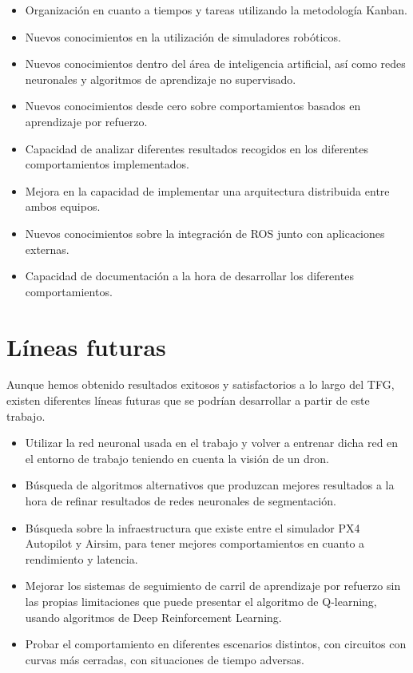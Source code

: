 \begin{itemize}
    \item Organización en cuanto a tiempos y tareas utilizando la metodología Kanban.
    \item Nuevos conocimientos en la utilización de simuladores robóticos.
    \item Nuevos conocimientos dentro del área de inteligencia artificial, así como redes neuronales y algoritmos de
    aprendizaje no supervisado. 
    \item Nuevos conocimientos desde cero sobre comportamientos basados en aprendizaje por refuerzo.
    \item Capacidad de analizar diferentes resultados recogidos en los diferentes comportamientos implementados.
    \item Mejora en la capacidad de implementar una arquitectura distribuida entre ambos equipos.
    \item Nuevos conocimientos sobre la integración de ROS junto con aplicaciones externas.
    \item Capacidad de documentación a la hora de desarrollar los diferentes comportamientos. 
\end{itemize}

\section{Líneas futuras}
\label{lineas_futuras}
Aunque hemos obtenido resultados exitosos y satisfactorios a lo largo del TFG, existen diferentes líneas futuras que se
podrían desarrollar a partir de este trabajo.

\begin{itemize}
\item Utilizar la red neuronal usada en el trabajo y volver a entrenar dicha red en el entorno de trabajo teniendo en
cuenta la visión de un dron.
\item Búsqueda de algoritmos alternativos que produzcan mejores resultados a la hora de refinar resultados de redes neuronales de segmentación.
\item Búsqueda sobre la infraestructura que existe entre el simulador PX4 Autopilot y Airsim, para tener mejores
comportamientos en cuanto a rendimiento y latencia.
\item Mejorar los sistemas de seguimiento de carril de aprendizaje por refuerzo sin las propias limitaciones que puede
presentar el algoritmo de Q-learning, usando algoritmos de Deep Reinforcement Learning.
\item Probar el comportamiento en diferentes escenarios distintos, con circuitos con curvas más cerradas, con situaciones de tiempo
adversas. 
\end{itemize}